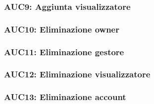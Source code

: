 \documentclass[../analisi-dei-requisiti.tex]{subfiles}
\begin{document}


\subsubsection{AUC9: Aggiunta visualizzatore}%
\label{subs:AUC9}



\subsubsection{AUC10: Eliminazione owner}%
\label{subs:AUC10}



\subsubsection{AUC11: Eliminazione gestore}%
\label{subs:AUC11}



\subsubsection{AUC12: Eliminazione visualizzatore}%
\label{subs:AUC12}



\subsubsection{AUC13: Eliminazione account}%
\label{subs:AUC13}


\end{document}
